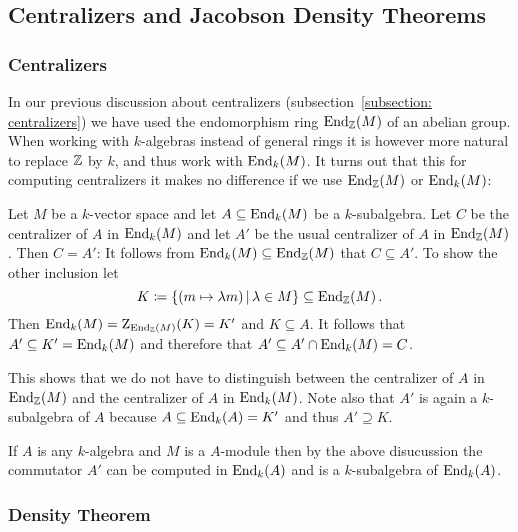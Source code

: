 \subsection*{Centralizers and Jacobson Density Theorems}



\subsubsection{Centralizers}

\begin{fluff}
  In our previous discussion about centralizers (subsection~\ref{subsection: centralizers}) we have used the endomorphism ring $\operatorname{End}_{\mathbb{Z}}(M)$ of an abelian group.
  When working with $k$-algebras instead of general rings it is however more natural to replace $\mathbb{Z}$ by $k$, and thus work with $\operatorname{End}_k(M)$.
  It turns out that this for computing centralizers it makes no difference if we use $\operatorname{End}_{\mathbb{Z}}(M)$ or $\operatorname{End}_k(M)$:
  
  Let $M$ be a $k$-vector space and let $A \subseteq \operatorname{End}_k(M)$ be a $k$-subalgebra.
  Let $C$ be the centralizer of $A$ in $\operatorname{End}_k(M)$ and let $A'$ be the usual centralizer of $A$ in $\operatorname{End}_{\mathbb{Z}}(M)$.
  Then $C = A'$:
  It follows from $\operatorname{End}_k(M) \subseteq \operatorname{End}_{\mathbb{Z}}(M)$ that $C \subseteq A'$.
  To show the other inclusion let
  \[
              K
    \defined  \{ (m \mapsto \lambda m) \suchthat \lambda \in M \}
    \subseteq \End_\Integer(M) \,.
  \]
  Then $\operatorname{End}_k(M) = \operatorname{Z}_{\operatorname{End}_{\mathbb{Z}}(M)}(K) = K'$ and $K \subseteq A$.
  It follows that $A' \subseteq K' = \operatorname{End}_k(M)$ and therefore that $A' \subseteq A' \cap \operatorname{End}_k(M) = C$.
  
  This shows that we do not have to distinguish between the centralizer of $A$ in $\operatorname{End}_{\mathbb{Z}}(M)$ and the centralizer of $A$ in $\operatorname{End}_k(M)$.
  Note also that $A'$ is again a $k$-subalgebra of $A$ because $A \subseteq \operatorname{End}_k(A) = K'$ and thus $A' \supseteq K$.
  
  If $A$ is any $k$-algebra and $M$ is a $A$-module then by the above disucussion the commutator $A'$ can be computed in $\operatorname{End}_k(A)$ and is a $k$-subalgebra of $\operatorname{End}_k(A)$.
\end{fluff}





\subsubsection{Density Theorem}


